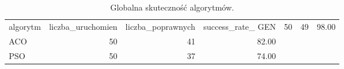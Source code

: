 \begin{table}
\caption{Globalna skuteczność algorytmów.}
\label{tab:success_rate}
\begin{tabular}{lrrr}
\toprule
algorytm & liczba_uruchomien & liczba_poprawnych & success_rate_%
\midrule
GEN & 50 & 49 & 98.00 \\
ACO & 50 & 41 & 82.00 \\
PSO & 50 & 37 & 74.00 \\
\bottomrule
\end{tabular}
\end{table}
